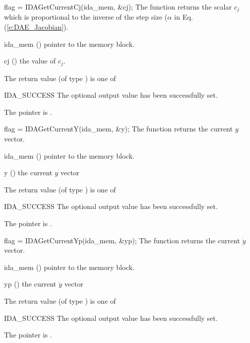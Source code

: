 {
  flag = IDAGetCurrentCj(ida\_mem, \&cj);
}
{
  The function  returns the scalar $c_j$
  which is proportional to the inverse of the step size ($\alpha$ in
  Eq. (\ref{e:DAE_Jacobian}). 
}
{
  \begin{args}
  \item[ida\_mem] ()
    pointer to the {\ida} memory block.
  \item[cj] ()
    the value of $c_j$.
  \end{args}
}
{
  The return value  (of type ) is one of
  \begin{args}
  \item[IDA\_SUCCESS]
    The optional output value has been successfully set.
  \item[\Id{IDA\_MEM\_NULL}]
    The  pointer is .
  \end{args}
}
{}

{
  flag = IDAGetCurrentY(ida\_mem, \&y);
}
{
  The function  returns the current $y$ vector.
}
{
  \begin{args}
  \item[ida\_mem] ()
    pointer to the {\ida} memory block.
  \item[y] ()
    the current $y$ vector
  \end{args}
}
{
  The return value  (of type ) is one of
  \begin{args}
  \item[IDA\_SUCCESS]
    The optional output value has been successfully set.
  \item[\Id{IDA\_MEM\_NULL}]
    The  pointer is .
  \end{args}
}
{}

{
  flag = IDAGetCurrentYp(ida\_mem, \&yp);
}
{
  The function  returns the current $\dot{y}$ vector.
}
{
  \begin{args}
  \item[ida\_mem] ()
    pointer to the {\ida} memory block.
  \item[yp] ()
    the current $\dot{y}$ vector
  \end{args}
}
{
  The return value  (of type ) is one of
  \begin{args}
  \item[IDA\_SUCCESS]
    The optional output value has been successfully set.
  \item[\Id{IDA\_MEM\_NULL}]
    The  pointer is .
  \end{args}
}
{}

